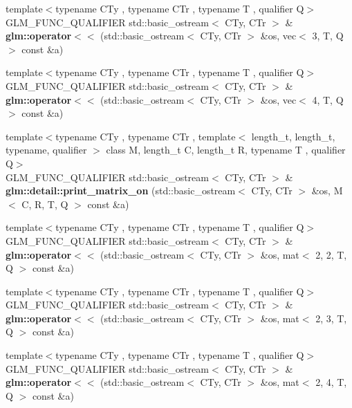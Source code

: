 \begin{DoxyCompactItemize}
\item 
{\footnotesize template$<$typename C\+Ty , typename C\+Tr , typename T , qualifier Q$>$ }\\G\+L\+M\+\_\+\+F\+U\+N\+C\+\_\+\+Q\+U\+A\+L\+I\+F\+I\+ER std\+::basic\+\_\+ostream$<$ C\+Ty, C\+Tr $>$ \& {\bfseries glm\+::operator$<$$<$} (std\+::basic\+\_\+ostream$<$ C\+Ty, C\+Tr $>$ \&os, vec$<$ 3, T, Q $>$ const \&a)
\item 
{\footnotesize template$<$typename C\+Ty , typename C\+Tr , typename T , qualifier Q$>$ }\\G\+L\+M\+\_\+\+F\+U\+N\+C\+\_\+\+Q\+U\+A\+L\+I\+F\+I\+ER std\+::basic\+\_\+ostream$<$ C\+Ty, C\+Tr $>$ \& {\bfseries glm\+::operator$<$$<$} (std\+::basic\+\_\+ostream$<$ C\+Ty, C\+Tr $>$ \&os, vec$<$ 4, T, Q $>$ const \&a)
\item 
\mbox{\label{io_8inl_a45b170ea667900227c6849ad1dfe1bf5}} 
{\footnotesize template$<$typename C\+Ty , typename C\+Tr , template$<$ length\+\_\+t, length\+\_\+t, typename, qualifier $>$ class M, length\+\_\+t C, length\+\_\+t R, typename T , qualifier Q$>$ }\\G\+L\+M\+\_\+\+F\+U\+N\+C\+\_\+\+Q\+U\+A\+L\+I\+F\+I\+ER std\+::basic\+\_\+ostream$<$ C\+Ty, C\+Tr $>$ \& {\bfseries glm\+::detail\+::print\+\_\+matrix\+\_\+on} (std\+::basic\+\_\+ostream$<$ C\+Ty, C\+Tr $>$ \&os, M$<$ C, R, T, Q $>$ const \&a)
\item 
{\footnotesize template$<$typename C\+Ty , typename C\+Tr , typename T , qualifier Q$>$ }\\G\+L\+M\+\_\+\+F\+U\+N\+C\+\_\+\+Q\+U\+A\+L\+I\+F\+I\+ER std\+::basic\+\_\+ostream$<$ C\+Ty, C\+Tr $>$ \& {\bfseries glm\+::operator$<$$<$} (std\+::basic\+\_\+ostream$<$ C\+Ty, C\+Tr $>$ \&os, mat$<$ 2, 2, T, Q $>$ const \&a)
\item 
{\footnotesize template$<$typename C\+Ty , typename C\+Tr , typename T , qualifier Q$>$ }\\G\+L\+M\+\_\+\+F\+U\+N\+C\+\_\+\+Q\+U\+A\+L\+I\+F\+I\+ER std\+::basic\+\_\+ostream$<$ C\+Ty, C\+Tr $>$ \& {\bfseries glm\+::operator$<$$<$} (std\+::basic\+\_\+ostream$<$ C\+Ty, C\+Tr $>$ \&os, mat$<$ 2, 3, T, Q $>$ const \&a)
\item 
{\footnotesize template$<$typename C\+Ty , typename C\+Tr , typename T , qualifier Q$>$ }\\G\+L\+M\+\_\+\+F\+U\+N\+C\+\_\+\+Q\+U\+A\+L\+I\+F\+I\+ER std\+::basic\+\_\+ostream$<$ C\+Ty, C\+Tr $>$ \& {\bfseries glm\+::operator$<$$<$} (std\+::basic\+\_\+ostream$<$ C\+Ty, C\+Tr $>$ \&os, mat$<$ 2, 4, T, Q $>$ const \&a)

\end{DoxyCompactItemize}
